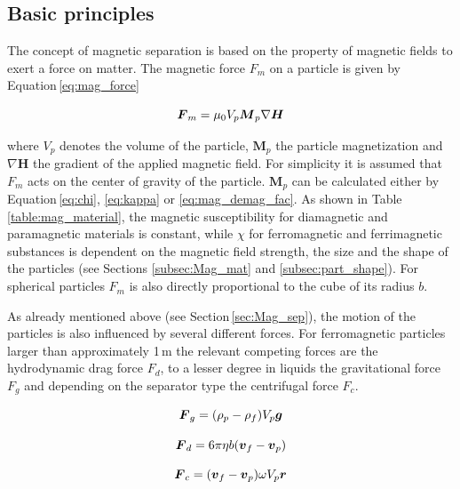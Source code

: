 \subsection{Basic principles}
\label{subsec:bas_princ}
The concept of magnetic separation is based on the property of magnetic fields to exert a force on matter. The magnetic force $F_{m}$ on a particle is given by Equation\,\ref{eq:mag_force}

\begin{equation}
\label{eq:mag_force}
\centering
\boldsymbol{F}_{m} = \mu_{0}V_{p}\boldsymbol{M}_{p}\nabla\boldsymbol{H}
\end{equation}

where $V_{p}$ denotes the volume of the particle, $\boldsymbol{M}_{p}$ the particle magnetization and $\nabla\boldsymbol{H}$ the gradient of the applied magnetic field. For simplicity it is assumed that $F_{m}$ acts on the center of gravity of the particle. $\boldsymbol{M}_{p}$ can be calculated either by Equation\,\ref{eq:chi}, \ref{eq:kappa} or \ref{eq:mag_demag_fac}. As shown in Table\,\ref{table:mag_material}, the magnetic susceptibility for diamagnetic and paramagnetic materials is constant, while $\chi$ for ferromagnetic and ferrimagnetic substances is dependent on the magnetic field strength, the size and the shape of the particles (see Sections \ref{subsec:Mag_mat} and \ref{subsec:part_shape}). For spherical particles $F_{m}$ is also directly proportional to the cube of its radius $b$. 

As already mentioned above (see Section\,\ref{sec:Mag_sep}), the motion of the particles is also influenced by several different  forces. For ferromagnetic particles larger than approximately 1\,\textmu m the relevant competing forces are  the hydrodynamic drag force $F_{d}$, to a lesser degree in liquids the gravitational force $F_{g}$ and depending on the separator type the centrifugal force $F_{c}$.  


\begin{equation}
\label{eq:grav_force}
\centering
\boldsymbol{F}_{g} = (\rho_{p}-\rho_{f})V_{p}\boldsymbol{g}
\end{equation}

\begin{equation}
\label{eq:drag_force}
\centering
\boldsymbol{F}_{d} = 6\pi\eta b(\boldsymbol{v}_{f}-\boldsymbol{v}_{p})
\end{equation}

\begin{equation}
\label{eq:cent_force}
\centering
\boldsymbol{F}_{c} = (\boldsymbol{v}_{f}-\boldsymbol{v}_{p})\omega V_{p}\boldsymbol{r}
\end{equation}

